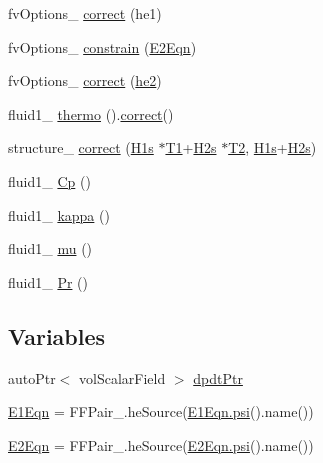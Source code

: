 \begin{DoxyCompactItemize}
\item 
fv\+Options\+\_\+ \hyperlink{EEqns__2p_8H_ab50155a535cfc13fa38edb9a5ef9fd87}{correct} (he1)
\item 
fv\+Options\+\_\+ \hyperlink{EEqns__2p_8H_af180247b0a68ad6eeda579a14d7234b1}{constrain} (\hyperlink{EEqns__2p_8H_ab7195c21c6aa9878d09f3679e78a218b}{E2\+Eqn})
\item 
fv\+Options\+\_\+ \hyperlink{EEqns__2p_8H_a0bb5fd8c78f1c7ffe7488375d6f6f467}{correct} (\hyperlink{EEqns__2p_8H_af939283a47b2563040fc040c5bd500d5}{he2})
\item 
fluid1\+\_\+ \hyperlink{EEqns__2p_8H_a9d615e711281a88a96c648787c7dbd32}{thermo} ().\hyperlink{hEqn_8H_a3a2458f7f54158be848527a3fdedd5dd}{correct}()
\item 
structure\+\_\+ \hyperlink{EEqns__2p_8H_a26e20ce53428fb9e482c1e6b1f4cd3f2}{correct} (\hyperlink{EEqns__2p_8H_a13d3a489c9472a915deb39f3ac78bb3f}{H1s} $\ast$\hyperlink{EEqns__2p_8H_a016032aa1b1ec0dd197a68119b12fd52}{T1}+\hyperlink{EEqns__2p_8H_ae1c73dc439878108bb08a1763fb58109}{H2s} $\ast$\hyperlink{EEqns__2p_8H_a616e91adeb29d49ab9d9f35f0124ab4a}{T2}, \hyperlink{EEqns__2p_8H_a13d3a489c9472a915deb39f3ac78bb3f}{H1s}+\hyperlink{EEqns__2p_8H_ae1c73dc439878108bb08a1763fb58109}{H2s})
\item 
fluid1\+\_\+ \hyperlink{EEqns__2p_8H_a22e809ffe40f4576f41f9d568f210983}{Cp} ()
\item 
fluid1\+\_\+ \hyperlink{EEqns__2p_8H_acced946b2cb97fb227183c4675fe5fdc}{kappa} ()
\item 
fluid1\+\_\+ \hyperlink{EEqns__2p_8H_a5f502f41f7fa5ac3329b38810d2514f6}{mu} ()
\item 
fluid1\+\_\+ \hyperlink{EEqns__2p_8H_ada5c16408b137a1f59af34049e925fc5}{Pr} ()
\end{DoxyCompactItemize}
\subsection*{Variables}
\begin{DoxyCompactItemize}
\item 
auto\+Ptr$<$ vol\+Scalar\+Field $>$ \hyperlink{EEqns__2p_8H_a2e030fc31a779d82f33f3010af4a2ff8}{dpdt\+Ptr}
\item 
\hyperlink{EEqns__2p_8H_a0d64ef58632fbee7a9e6043486109a4f}{E1\+Eqn} = F\+F\+Pair\+\_\+.\+he\+Source(\hyperlink{UEqn__1pl_8H_a165a34deec3ee505598e511a88831968}{E1\+Eqn.\+psi}().name())
\item 
\hyperlink{EEqns__2p_8H_aabebc3b50a1fc117e4aaa3b5c894198b}{E2\+Eqn} = F\+F\+Pair\+\_\+.\+he\+Source(\hyperlink{UEqn__1pl_8H_a165a34deec3ee505598e511a88831968}{E2\+Eqn.\+psi}().name())
\end{DoxyCompactItemize}


